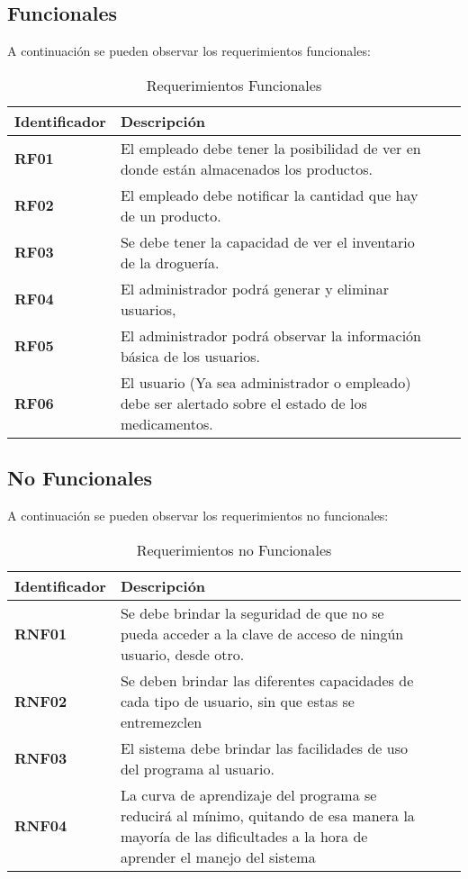 \subsection{Funcionales}
A continuación se pueden observar los requerimientos funcionales: \\
\begin{table}[h!]
	\begin{center}
		\begin{tabular}{| l |p{10cm} | l |p{30cm}|} 
			\hline
			\textbf{Identificador} & \textbf{Descripci\'on} \\
			\hline
		\textbf{RF01} & El empleado debe tener la posibilidad de ver en donde están almacenados los productos.\\ \hline
		\textbf{RF02} & El empleado debe notificar la cantidad que hay de un producto.\\ \hline
		\textbf{RF03} & Se debe tener la capacidad de ver el inventario de la droguería.\\ \hline
		\textbf{RF04} & El administrador podrá generar y eliminar usuarios,\\ \hline
		\textbf{RF05} & El administrador podrá observar la información básica de los usuarios.\\ \hline
		\textbf{RF06} & El usuario (Ya sea administrador o empleado) debe ser alertado sobre el estado de los medicamentos.\\ \hline
		\end{tabular}
		\caption{Requerimientos Funcionales}
		\label{reqFunc}
	\end{center}
\end{table}
\subsection{No Funcionales}
A continuación se pueden observar los requerimientos no funcionales: \\
\begin{table}[h!]
	\begin{center}
		\begin{tabular}{| l |p{10cm} | l |p{30cm}|} 
			\hline
			\textbf{Identificador} & \textbf{Descripci\'on} \\
			\hline
			\textbf{RNF01} & Se debe brindar la seguridad de que no se pueda acceder a la clave de acceso de ningún usuario, desde otro.\\ \hline
			\textbf{RNF02} & Se deben brindar las diferentes capacidades de cada tipo de usuario, sin que estas se entremezclen\\ \hline
			\textbf{RNF03} & El sistema debe brindar las facilidades de uso del programa al usuario.\\ \hline
			\textbf{RNF04} & La curva de aprendizaje del programa se reducirá al mínimo, quitando de esa manera la mayoría de las dificultades a la hora de aprender el manejo del sistema\\ \hline
		\end{tabular}
		\caption{Requerimientos no Funcionales}
		\label{reqNFunc}
	\end{center}
\end{table}
